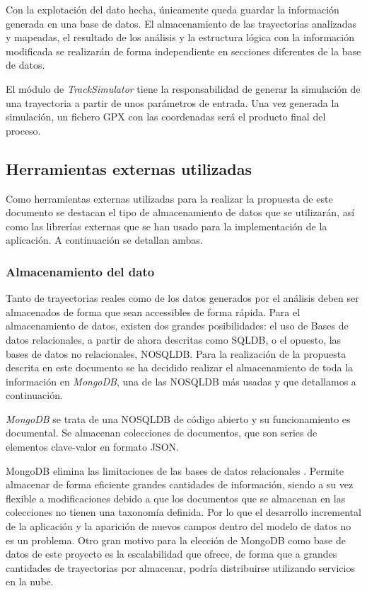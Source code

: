 Con la explotación del dato hecha, únicamente queda guardar la información generada en una base de datos.
El almacenamiento de las trayectorias analizadas y mapeadas, el resultado de los análisis y la estructura 
lógica con la información modificada se realizarán de forma independiente en secciones diferentes de la 
base de datos.

El módulo de \textit{TrackSimulator} tiene la responsabilidad de generar la simulación de una trayectoria 
a partir de unos parámetros de entrada. Una vez generada la simulación, un fichero \ac{GPX} con las 
coordenadas será el producto final del proceso.
 
\subsection{Herramientas externas utilizadas} 
Como herramientas externas utilizadas para la realizar la propuesta de este documento se destacan 
el tipo de almacenamiento de datos que se utilizarán, así como las librerías externas que se han usado 
para la implementación de la aplicación. A continuación se detallan ambas.

\subsubsection{Almacenamiento del dato}
Tanto de trayectorias reales como de los datos generados por el análisis deben ser almacenados 
de forma que sean accessibles de forma rápida.
Para el almacenamiento de datos, existen dos grandes posibilidades: el uso de Bases de datos relacionales, 
a partir de ahora descritas como \ac{SQLDB},
o el opuesto, las bases de datos no relacionales, \ac{NOSQLDB}.
Para la realización de la propuesta descrita en este documento se ha decidido realizar el almacenamiento de 
toda la información en \textit{MongoDB}, una de las \ac{NOSQLDB}
más usadas y que detallamos a continuación.

\textit{MongoDB} se trata de una \ac{NOSQLDB} de código abierto y su funcionamiento es documental. 
Se almacenan colecciones de documentos, que son series de elementos clave-valor en formato JSON.

MongoDB elimina las limitaciones de las bases de datos relacionales \cite{Mongo01}. 
Permite almacenar de forma eficiente grandes cantidades de información, siendo
a su vez flexible a modificaciones debido a que los documentos que se almacenan en las colecciones no tienen 
una taxonomía definida. Por lo que el desarrollo incremental de la aplicación y la aparición de nuevos 
campos dentro del modelo de datos no es un problema.
Otro gran motivo para la elección de MongoDB como base de datos de este proyecto es la escalabilidad 
que ofrece, de forma que a grandes cantidades de trayectorias por almacenar, podría distribuirse utilizando servicios en la nube.

